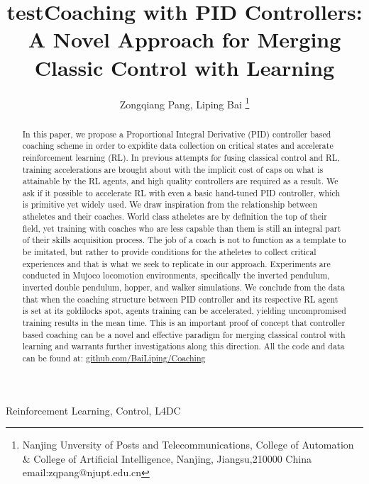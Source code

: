 \documentclass[journal]{IEEEtran}
\begin{document}
    \title{test}
\title{Coaching with PID Controllers: A Novel Approach for Merging Classic Control with Learning}

\author{ Zongqiang Pang, Liping Bai \thanks{Nanjing Unversity of Posts and Telecommunications, College of Automation \& College of Artificial Intelligence, Nanjing, Jiangsu,210000 China email:zqpang@njupt.edu.cn}}
\maketitle
\begin{abstract}
In this paper, we propose a Proportional Integral Derivative (PID) controller based coaching scheme in order to expidite data collection on critical states and accelerate reinforcement learning (RL). In previous attempts for fusing classical control and RL, training accelerations are brought about with the implicit cost of caps on what is attainable by the RL agents, and high quality controllers are required as a result. We ask if it possible to accelerate RL with even a basic hand-tuned PID controller, which is primitive yet widely used. We draw inspiration from the relationship between atheletes and their coaches. World class atheletes are by definition the top of their field, yet training with coaches who are less capable than them is still an integral part of their skills acquisition process. The job of a coach is not to function as a template to be imitated, but rather to provide conditions for the atheletes to collect critical experiences and that is what we seek to replicate in our approach. Experiments are conducted in Mujoco locomotion environments, specifically the inverted pendulum, inverted double pendulum, hopper, and walker simulations. We conclude from the data that when the coaching structure between PID controller and its respective RL agent is set at its goldilocks spot, agents training can be accelerated, yielding uncompromised training results in the mean time. This is an important proof of concept that controller based coaching can be a novel and effective paradigm for merging classical control with learning and warrants further investigations along this direction. All the code and data can be found at: \href{https://github.com/BaiLiping/Coaching}{github.com/BaiLiping/Coaching}
\end{abstract}
\begin{IEEEkeywords}
Reinforcement Learning, Control, L4DC
\end{IEEEkeywords}
\IEEEpeerreviewmaketitle
\end{document}

